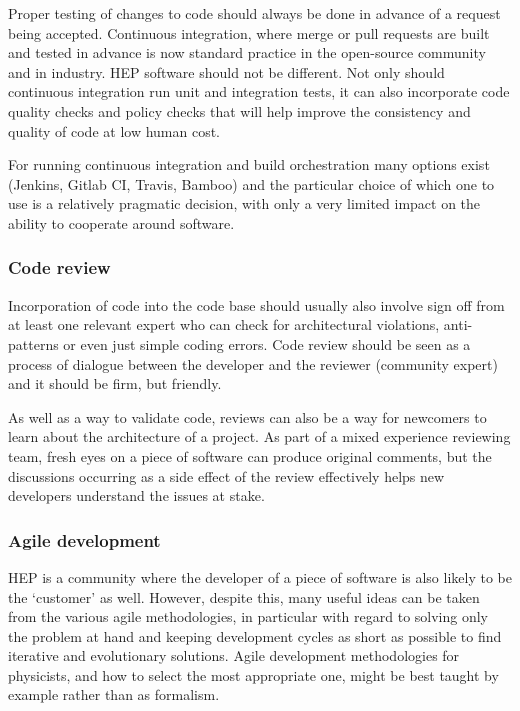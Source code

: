 \documentclass[12pt,a4paper]{article}
\begin{document}
Proper testing of changes to code should always be done in advance of a
request being accepted. Continuous integration, where merge or pull
requests are built and tested in advance is now standard practice in the
open-source community and in industry. HEP software should not be
different. Not only should continuous integration run unit and
integration tests, it can also incorporate code quality checks and
policy checks that will help improve the consistency and quality of code
at low human cost.

For running continuous integration and build orchestration many options
exist (Jenkins, Gitlab CI, Travis, Bamboo) and the particular choice of
which one to use is a relatively pragmatic decision, with only a very
limited impact on the ability to cooperate around software.

\hypertarget{code-review}{%
\subsubsection{Code review}\label{code-review}}

Incorporation of code into the code base should usually also involve
sign off from at least one relevant expert who can check for
architectural violations, anti-patterns or even just simple coding
errors. Code review should be seen as a process of dialogue between the
developer and the reviewer (community expert) and it should be firm, but
friendly.

As well as a way to validate code, reviews can also be a way for
newcomers to learn about the architecture of a project. As part of a
mixed experience reviewing team, fresh eyes on a piece of software can
produce original comments, but the discussions occurring as a side
effect of the review effectively helps new developers understand the
issues at stake.

\hypertarget{agile-development}{%
\subsubsection{Agile development}\label{agile-development}}

HEP is a community where the developer of a piece of software is also
likely to be the `customer' as well. However, despite this, many useful
ideas can be taken from the various agile methodologies, in particular
with regard to solving only the problem at hand and keeping development
cycles as short as possible to find iterative and evolutionary
solutions. Agile development methodologies for physicists, and how to
select the most appropriate one, might be best taught by example rather
than as formalism.
\end{document}
